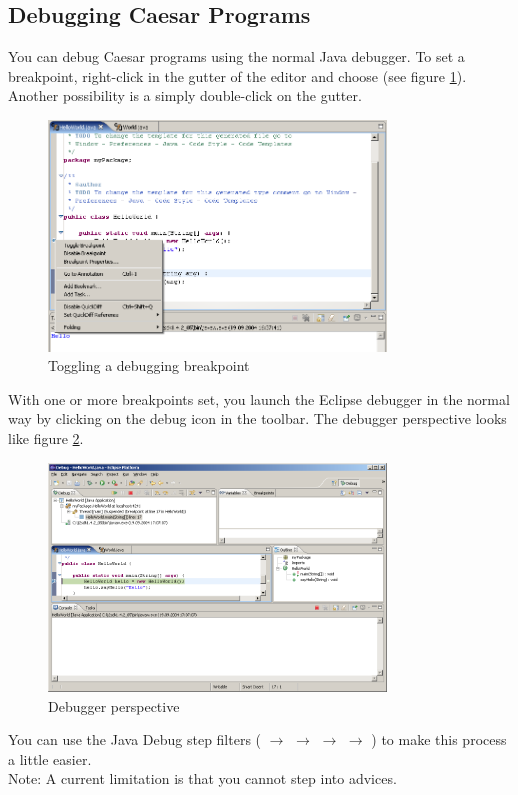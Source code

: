\subsection{Debugging Caesar Programs}
You can debug Caesar programs using the normal Java debugger. To set a breakpoint, right-click in the gutter of the editor and choose (see figure \ref{fig:brake_point}). Another possibility is a simply double-click on the gutter.
\begin{figure}[htbp]
	\centering
		\includegraphics[width=0.80\textwidth]{images/brake_point.png}
	\caption{Toggling a debugging breakpoint}
	\label{fig:brake_point}
\end{figure}

With one or more breakpoints set, you launch the Eclipse debugger in the normal way by clicking on the debug icon in the toolbar. The debugger perspective looks like figure \ref{fig:debuger}.
\begin{figure}[htbp]
	\centering
		\includegraphics[width=0.80\textwidth]{images/debug1.png}
	\caption{Debugger perspective}
	\label{fig:debuger}
\end{figure}

You can use the Java Debug step filters ( $\rightarrow$  $\rightarrow$  $\rightarrow$  $\rightarrow$ ) to make this process a little easier.\\
Note: A current limitation is that you cannot step into advices.